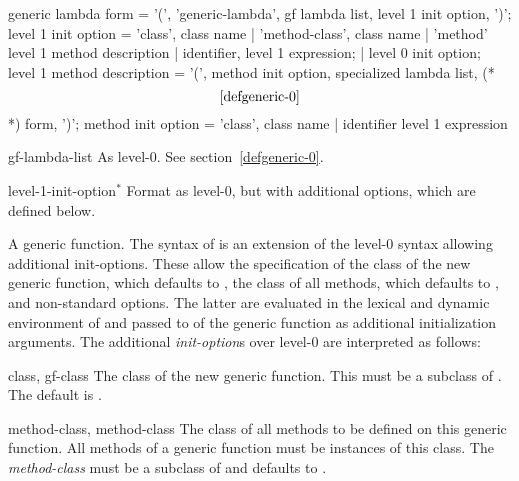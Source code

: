 \begin{optDefinition}
\label{generic-lambda-1}
%
\Syntax
\savesyntax\genericLambdaOneSyntax\vbox{\small\syntax
generic lambda form
   = '(', 'generic-lambda', gf lambda list,
     {level 1 init option}, ')';
level 1 init option
   = 'class', class name
   | 'method-class', class name
   | 'method' level 1 method description
   | identifier, level 1 expression;
   | level 0 init option;
level 1 method description
   = '(', {method init option},
     specialized lambda list,  (* \[\ref{defgeneric-0}\] *)
     {form}, ')';
method init option
   = 'class', class name
   | identifier level 1 expression
\endsyntax}
%
\begin{arguments}
    \item[gf-lambda-list] As level-0.  See section~\ref{defgeneric-0}.

    \item[level-1-init-option\/$^*$] Format as level-0, but with additional
    options, which are defined below.
\end{arguments}
%
\result%
A generic function.
%
\remarks%
The syntax of  is an extension of the level-0
syntax allowing additional init-options.  These allow the
specification of the class of the new generic function, which defaults
to , the class of all methods, which defaults
to , and non-standard options. The latter are evaluated
in the lexical and dynamic environment of  and
passed to  of the generic function as additional
initialization arguments.  The additional {\em init-option\/}s over
level-0 are interpreted as follows:
%
\begin{options}

    \item[class, gf-class] The class of the new generic function.  This must be
    a subclass of .  The default is
    .

    \item[method-class, method-class] The class of all methods to be defined on
    this generic function.  All methods of a generic function must be instances
    of this class.  The {\em method-class} must be a subclass of
     and defaults to .


\end{options}
\end{optDefinition}

